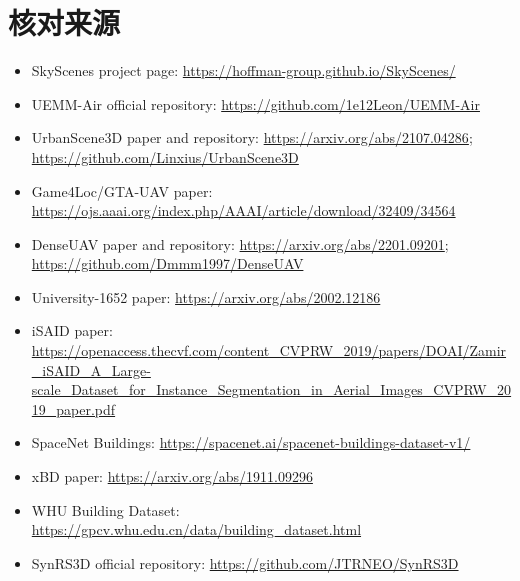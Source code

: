 \documentclass[11pt,a4paper]{ctexart}
\begin{document}
\section*{核对来源}
\begin{itemize}
\item SkyScenes project page: \url{https://hoffman-group.github.io/SkyScenes/}
\item UEMM-Air official repository: \url{https://github.com/1e12Leon/UEMM-Air}
\item UrbanScene3D paper and repository: \url{https://arxiv.org/abs/2107.04286}; \url{https://github.com/Linxius/UrbanScene3D}
\item Game4Loc/GTA-UAV paper: \url{https://ojs.aaai.org/index.php/AAAI/article/download/32409/34564}
\item DenseUAV paper and repository: \url{https://arxiv.org/abs/2201.09201}; \url{https://github.com/Dmmm1997/DenseUAV}
\item University-1652 paper: \url{https://arxiv.org/abs/2002.12186}
\item iSAID paper: \url{https://openaccess.thecvf.com/content_CVPRW_2019/papers/DOAI/Zamir_iSAID_A_Large-scale_Dataset_for_Instance_Segmentation_in_Aerial_Images_CVPRW_2019_paper.pdf}
\item SpaceNet Buildings: \url{https://spacenet.ai/spacenet-buildings-dataset-v1/}
\item xBD paper: \url{https://arxiv.org/abs/1911.09296}
\item WHU Building Dataset: \url{https://gpcv.whu.edu.cn/data/building_dataset.html}
\item SynRS3D official repository: \url{https://github.com/JTRNEO/SynRS3D}
\end{itemize}
\end{document}
